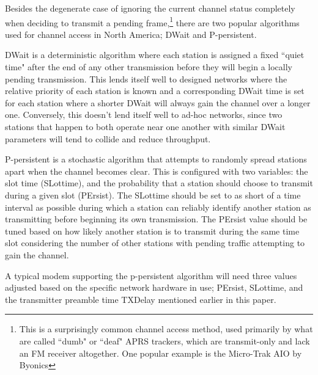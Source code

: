 \documentclass[12pt,letterpaper]{article}
\begin{document}
Besides the degenerate case of ignoring the current channel status completely when 
deciding to transmit a pending frame,\footnote{This is a surprisingly
	common channel access method, used primarily by what are called ``dumb" or
	``deaf" APRS trackers, which are transmit-only and lack an
FM receiver altogether. One popular example is the Micro-Trak AIO by Byonics}
there are two popular algorithms used for
channel access in North America;
DWait and P-persistent.

DWait is a deterministic algorithm where each station is assigned a fixed
``quiet time" after the end of any other transmission 
before they will begin a locally pending transmission. 
This lends itself well to designed networks
where the relative priority of each station is known and a corresponding DWait time
is set for each station where a shorter DWait will 
always gain the channel over a longer one. 
Conversely, this doesn't lend itself well to ad-hoc networks,
since two stations that happen to both operate near one another 
with similar DWait parameters
will tend to collide and reduce throughput.

P-persistent is a stochastic algorithm that attempts to randomly spread
stations apart when the channel becomes clear. 
This is configured with two variables: the slot time (SLottime), and the
probability that a station should choose to transmit during a given slot (PErsist). 
The SLottime
should be set to as short of a time interval as possible during which a station can
reliably identify another station as transmitting 
before beginning its own transmission.
The PErsist value should be tuned based on how likely another station is to transmit 
during the same time slot considering the number of other stations with 
pending traffic attempting to gain the channel.

A typical modem supporting the p-persistent algorithm will need three values adjusted
based on the specific network hardware in use; PErsist, SLottime, and the 
transmitter preamble time TXDelay mentioned earlier in this paper.
\end{document}
